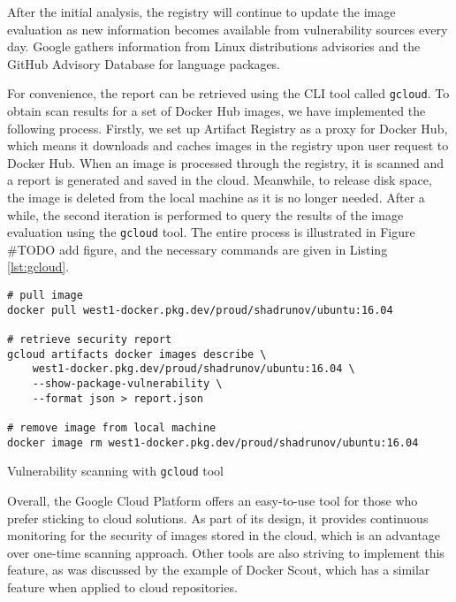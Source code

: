 \FloatBarrier

After the initial analysis, the registry will continue to update the image evaluation as new information becomes available from vulnerability sources every day. Google gathers information from Linux distributions advisories and the GitHub Advisory Database for language packages.

For convenience, the report can be retrieved using the CLI tool called \texttt{gcloud}. To obtain scan results for a set of Docker Hub images, we have implemented the following process. Firstly, we set up Artifact Registry as a proxy for Docker Hub, which means it downloads and caches images in the registry upon user request to Docker Hub. When an image is processed through the registry, it is scanned and a report is generated and saved in the cloud. Meanwhile, to release disk space, the image is deleted from the local machine as it is no longer needed. After a while, the second iteration is performed to query the results of the image evaluation using the \texttt{gcloud} tool. The entire process is illustrated in Figure \#TODO add figure, and the necessary commands are given in Listing \ref{lst:gcloud}.

\begin{listing}[htp]
    \centering
    \begin{minipage}{0.85\linewidth}
        \begin{verbatim}
# pull image
docker pull west1-docker.pkg.dev/proud/shadrunov/ubuntu:16.04

# retrieve security report
gcloud artifacts docker images describe \
    west1-docker.pkg.dev/proud/shadrunov/ubuntu:16.04 \
    --show-package-vulnerability \
    --format json > report.json

# remove image from local machine
docker image rm west1-docker.pkg.dev/proud/shadrunov/ubuntu:16.04
        \end{verbatim}
    \end{minipage}
    \caption{Vulnerability scanning with \texttt{gcloud} tool}
    \label{lst:gcloud}
\end{listing}

Overall, the Google Cloud Platform offers an easy-to-use tool for those who prefer sticking to cloud solutions. As part of its design, it provides continuous monitoring for the security of images stored in the cloud, which is an advantage over one-time scanning approach. Other tools are also striving to implement this feature, as was discussed by the example of Docker Scout, which has a similar feature when applied to cloud repositories.

